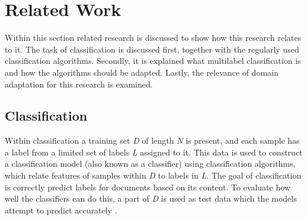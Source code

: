 \section{Related Work}
\label{sec:rel}
Within this section related research is discussed to show how this research relates to it. The task of classification is discussed first, together with the regularly used classification algorithms. Secondly, it is explained what multilabel classification is and how the algorithms should be adapted. Lastly, the relevance of domain adaptation for this research is examined.

\subsection{Classification}
Within classification a training set \textit{D} of length \textit{N} is present, and each sample has a label from a limited set of labels \textit{L} assigned to it. This data is used to construct a classification model (also known as a classifier) using classification algorithms, which relate features of samples within \textit{D} to labels in \textit{L}. The goal of classification is correctly predict labels for documents based on its content. To evaluate how well the classifiers can do this, a part of \textit{D} is used as test data which the models attempt to predict accurately \cite{aggarwal2012survey}. 

